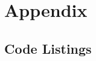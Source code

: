 \documentclass[draft,final]{thesisclass} %
\begin{document}
\backmatter


\nocite{*}



\printindex

\printglossaries


\chapter{Appendix}
\setcounter{page}{1}

\section{Code Listings}


\end{document}

